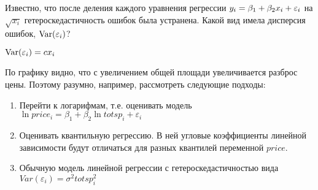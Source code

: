 \documentclass[pdftex,11pt,openany]{book}\usepackage[]{graphicx}\usepackage[]{color}
\makeatletter
\newcommand{\hlstr}[1]{\textcolor[rgb]{0.192,0.494,0.8}{#1}}%
\newcommand{\hlopt}[1]{\textcolor[rgb]{0,0,0}{#1}}%
\newcommand{\hlstd}[1]{\textcolor[rgb]{0.345,0.345,0.345}{#1}}%
\newcommand{\hlkwc}[1]{\textcolor[rgb]{0.333,0.667,0.333}{#1}}%
\newcommand{\hlkwd}[1]{\textcolor[rgb]{0.737,0.353,0.396}{\textbf{#1}}}%
\newenvironment{kframe}{%
 \def\at@end@of@kframe{}%
 \ifinner\ifhmode%
  \def\at@end@of@kframe{\end{minipage}}%
  \begin{minipage}{\columnwidth}%
 \fi\fi%
 \def\FrameCommand##1{\hskip\@totalleftmargin \hskip-\fboxsep
 \colorbox{shadecolor}{##1}\hskip-\fboxsep
     \hskip-\linewidth \hskip-\@totalleftmargin \hskip\columnwidth}%
 \MakeFramed {\advance\hsize-\width
   \@totalleftmargin\z@ \linewidth\hsize
   \@setminipage}}%
 {\par\unskip\endMakeFramed%
 \at@end@of@kframe}
\newenvironment{knitrout}{}{} %
\makeatother
\begin{document}
\begin{problem}
Известно, что после деления каждого уравнения регрессии $y_i = \beta_1 + \beta_2 x_i + \varepsilon_i$ на $\sqrt{x_i}$ гетероскедастичность ошибок была устранена. Какой вид имела дисперсия ошибок, $\operatorname{Var}(\varepsilon_i)$?
\end{problem}
\begin{solution}
$\operatorname{Var}(\varepsilon_i)=c x_i$
\end{solution}




\begin{solution}
По графику видно, что с увеличением общей площади увеличивается разброс цены. Поэтому разумно, например, рассмотреть следующие подходы:
\begin{enumerate}
\item Перейти к логарифмам, т.е. оценивать модель $\ln price_i=\beta_1+\beta_2 \ln totsp_i +\varepsilon_i$
\item Оценивать квантильную регрессию. В ней угловые коэффициенты линейной зависимости будут отличаться для разных квантилей переменной $price$.
\item Обычную модель линейной регрессии с гетероскедастичностью вида $Var(\varepsilon_i)=\sigma^2 totsp_i^2$
\end{enumerate} 
\end{solution}
\end{document}
